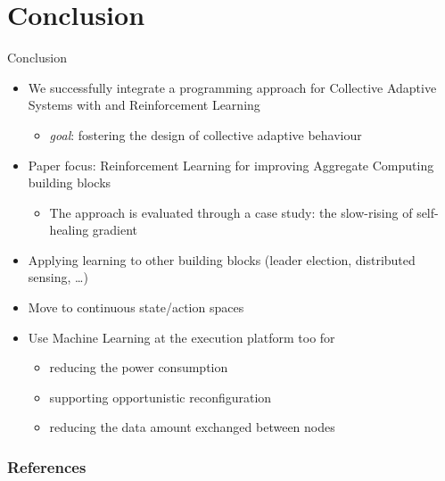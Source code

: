 \documentclass[9pt, aspectratio=169, handout]{beamer}
\begin{document}
\section{Conclusion}
\begin{frame}{Conclusion}
  \begin{cardTiny}
  \begin{itemize}
    \item We successfully integrate a programming approach for Collective Adaptive Systems with and Reinforcement Learning
    \begin{itemize}
      \item \emph{goal}:  fostering the design of collective adaptive behaviour
    \end{itemize}
    \item Paper focus: Reinforcement Learning for improving Aggregate Computing building blocks
    \begin{itemize}
      \item The approach is evaluated through a case study: the slow-rising of self-healing gradient 
    \end{itemize}
  \end{itemize}
  \end{cardTiny}
  \begin{card}
    \begin{itemize}
      \item Applying learning to other building blocks (leader election, distributed sensing, \dots)
      \item Move to continuous state/action spaces
      \item Use Machine Learning at the execution platform too for
      \begin{itemize}
        \item reducing the power consumption
        \item supporting opportunistic reconfiguration
        \item reducing the data amount exchanged between nodes
      \end{itemize}
    \end{itemize}
  \end{card}
\end{frame}

\begin{frame}[allowframebreaks]
  \frametitle{References}
  \printbibliography
\end{frame}
\end{document}

